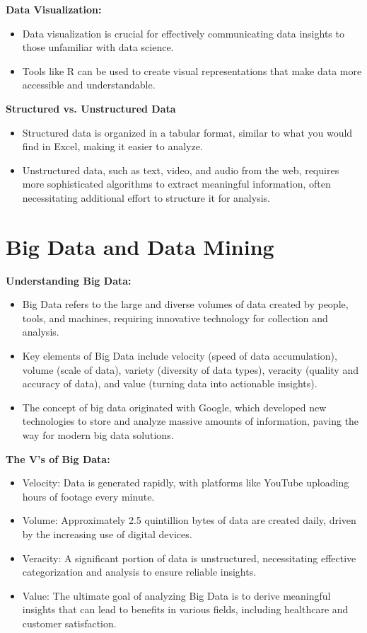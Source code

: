 \documentclass[12pt]{report} %
\begin{document}
	\noindent \textbf{Data Visualization:}
	\begin{itemize}
		\item Data visualization is crucial for effectively communicating data insights to those unfamiliar with data science.
		\item Tools like R can be used to create visual representations that make data more accessible and understandable.
	\end{itemize}

	\noindent \textbf{Structured vs. Unstructured Data}
	\begin{itemize}
		\item Structured data is organized in a tabular format, similar to what you would find in Excel, making it easier to analyze.
		\item Unstructured data, such as text, video, and audio from the web, requires more sophisticated algorithms to extract meaningful information, often necessitating additional effort to structure it for analysis.
	\end{itemize}

	\section{Big Data and Data Mining}
	
	
	\noindent \textbf{Understanding Big Data:}
	\begin{itemize}
		\item Big Data refers to the large and diverse volumes of data created by people, tools, and machines, requiring innovative technology for collection and analysis.
		\item Key elements of Big Data include velocity (speed of data accumulation), volume (scale of data), variety (diversity of data types), veracity (quality and accuracy of data), and value (turning data into actionable insights).
		\item The concept of big data originated with Google, which developed new technologies to store and analyze massive amounts of information, paving the way for modern big data solutions.
	\end{itemize}

	\noindent \textbf{The V's of Big Data:}
	\begin{itemize}
		\item Velocity: Data is generated rapidly, with platforms like YouTube uploading hours of footage every minute.
		\item Volume: Approximately 2.5 quintillion bytes of data are created daily, driven by the increasing use of digital devices.
		\item Veracity: A significant portion of data is unstructured, necessitating effective categorization and analysis to ensure reliable insights.
		\item Value: The ultimate goal of analyzing Big Data is to derive meaningful insights that can lead to benefits in various fields, including healthcare and customer satisfaction.
	\end{itemize}
\end{document}
